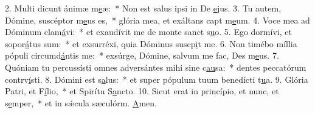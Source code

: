 2. Multi dicunt ánimæ m\uline{e}æ:~* Non est salus ipsi in De \uline{e}jus.
3. Tu autem, Dómine, suscéptor m\uline{e}us es,~* glória mea, et exáltans capt m\uline{e}um.
4. Voce mea ad Dóminum clam\uline{á}vi:~* et exaudívit me de monte sanct s\uline{u}o.
5. Ego dormívi, et sopor\uline{á}tus sum:~* et exsurréxi, quia Dóminus suscp\uline{i}t me.
6. Non timébo míllia pópuli circumd\uline{á}ntis me:~* exsúrge, Dómine, salvum me fac, Des m\uline{e}us.
7. Quóniam tu percussísti omnes adversántes mihi sine c\uline{au}sa:~* dentes peccatórum contrv\uline{í}sti.
8. Dómini est s\uline{a}lus:~* et super pópulum tuum benedícti t\uline{u}a.
9. Glória Patri, et F\uline{í}lio,~* et Spirítu S\uline{a}ncto.
10. Sicut erat in princípio, et nunc, et s\uline{e}mper,~* et in sǽcula sæculórm. \uline{A}men.
